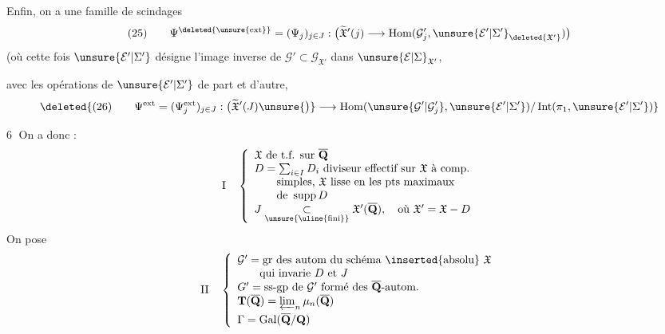Enfin, on a une famille de scindages 
\[
(25)\qquad\Psi^{\deleted{\unsure{\mathrm{ext}}}}=(\Psi_j)_{j\in J}:\bigl(\widetilde{\mathfrak X}'(j)\longrightarrow\operatorname{Hom}(\mathcal G'_j,\unsure{\mathcal E'|\Sigma'}_{\deleted{\mathfrak X'}})\bigr)
\]
(où cette fois $\unsure{\mathcal E'|\Sigma'}$ désigne l'image inverse
de $\mathcal G'\subset\mathcal G_{\mathfrak X'}$ dans $\unsure{\mathcal E|\Sigma}_{\mathfrak X'}$, 
avec les opérations de $\unsure{\mathcal E'|\Sigma'}$ de part et
d'autre, 
\[
\deleted{(26)\qquad\Psi^{\mathrm{ext}}=(\Psi_j^{\mathrm{ext}})_{j\in J}:\bigl(\widetilde{\mathfrak X}'(J)\unsure{\bigr)}\longrightarrow\operatorname{Hom}(\unsure{\mathcal G'|\mathcal G'_j},\unsure{\mathcal E'|\Sigma'})/\operatorname{Int}(\pi_1,\unsure{\mathcal E'|\Sigma'})}
\]

\textcircled{6}  On a donc : 
\[
\mathrm I\quad\left\{\begin{array}{l}
\mathfrak X\text{ de t.f. sur }\overline{\mathbf Q}\\
D=\sum_{i\in I}D_i\text{ diviseur effectif sur }\mathfrak X\text{ à comp.}\\
\qquad\text{simples, }\mathfrak X\text{ lisse en les pts maximaux}\\
\qquad\text{de }\operatorname{supp}D\\
J\underset{\text{\unsure{\uline{fini}}}}{\subset}\mathfrak X'(\overline{\mathbf Q}),\quad\text{où }\mathfrak X'=\mathfrak X-D
\end{array}\right.
\]
On pose\margin{(}
\[
\mathrm{II}\quad\left\{\begin{array}{l}
\mathcal G'=\text{gr des autom du schéma \inserted{absolu} }\mathfrak X\\
\qquad\text{qui invarie }D\text{ et }J\\
G'=\text{ss-gp de }\mathcal G'\text{ formé des }\overline{\mathbf Q}\text{-autom.}\\
\mathbf T(\overline{\mathbf Q})=\varprojlim_n\mu_n(\overline{\mathbf Q})\\[1ex]
\Gamma=\operatorname{Gal}(\overline{\mathbf Q}/\mathbf Q)
\end{array}\right.
\]

